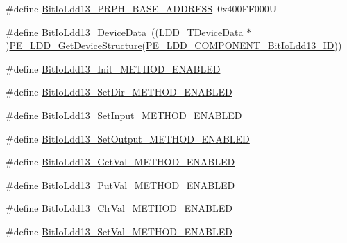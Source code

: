 \begin{DoxyCompactItemize}
\item 
\#define \hyperlink{group___bit_io_ldd13__module_ga9af6c37dac38dc95b22ff97e206a9021}{Bit\+Io\+Ldd13\+\_\+\+P\+R\+P\+H\+\_\+\+B\+A\+S\+E\+\_\+\+A\+D\+D\+R\+E\+SS}~0x400\+F\+F000U
\item 
\#define \hyperlink{group___bit_io_ldd13__module_gaced3b535c8325a9d8bcaa5fcc7de35d7}{Bit\+Io\+Ldd13\+\_\+\+Device\+Data}~((\hyperlink{group___p_e___types__module_gac5cf1362f1f0e3a2ce71b1bf2276d091}{L\+D\+D\+\_\+\+T\+Device\+Data} $\ast$)\hyperlink{group___p_e___types__module_gaa1c23d559daef5bcd3327ca83fb56f5a}{P\+E\+\_\+\+L\+D\+D\+\_\+\+Get\+Device\+Structure}(\hyperlink{group___p_e___types__module_ga4ef96663661667261ec29899d6e8c193}{P\+E\+\_\+\+L\+D\+D\+\_\+\+C\+O\+M\+P\+O\+N\+E\+N\+T\+\_\+\+Bit\+Io\+Ldd13\+\_\+\+ID}))
\item 
\#define \hyperlink{group___bit_io_ldd13__module_ga7f939fd29ea9a4135356c1ad35e5b70b}{Bit\+Io\+Ldd13\+\_\+\+Init\+\_\+\+M\+E\+T\+H\+O\+D\+\_\+\+E\+N\+A\+B\+L\+ED}
\item 
\#define \hyperlink{group___bit_io_ldd13__module_gafded67a88a7efefcbd5c98e1e91b11c4}{Bit\+Io\+Ldd13\+\_\+\+Set\+Dir\+\_\+\+M\+E\+T\+H\+O\+D\+\_\+\+E\+N\+A\+B\+L\+ED}
\item 
\#define \hyperlink{group___bit_io_ldd13__module_ga381b0f9ebd3d42e767e2f055436875be}{Bit\+Io\+Ldd13\+\_\+\+Set\+Input\+\_\+\+M\+E\+T\+H\+O\+D\+\_\+\+E\+N\+A\+B\+L\+ED}
\item 
\#define \hyperlink{group___bit_io_ldd13__module_ga8343bb6f91fd2e39cafd3bc1deb16a82}{Bit\+Io\+Ldd13\+\_\+\+Set\+Output\+\_\+\+M\+E\+T\+H\+O\+D\+\_\+\+E\+N\+A\+B\+L\+ED}
\item 
\#define \hyperlink{group___bit_io_ldd13__module_ga447c2d2dc0aaf2e6167f5ed603d68355}{Bit\+Io\+Ldd13\+\_\+\+Get\+Val\+\_\+\+M\+E\+T\+H\+O\+D\+\_\+\+E\+N\+A\+B\+L\+ED}
\item 
\#define \hyperlink{group___bit_io_ldd13__module_ga8bd3f8fef096bf595018116a0d0808b9}{Bit\+Io\+Ldd13\+\_\+\+Put\+Val\+\_\+\+M\+E\+T\+H\+O\+D\+\_\+\+E\+N\+A\+B\+L\+ED}
\item 
\#define \hyperlink{group___bit_io_ldd13__module_ga96d86b466508b8e3ba4342e527e44161}{Bit\+Io\+Ldd13\+\_\+\+Clr\+Val\+\_\+\+M\+E\+T\+H\+O\+D\+\_\+\+E\+N\+A\+B\+L\+ED}
\item 
\#define \hyperlink{group___bit_io_ldd13__module_gabc17c2e09694f871f364b31bf1288703}{Bit\+Io\+Ldd13\+\_\+\+Set\+Val\+\_\+\+M\+E\+T\+H\+O\+D\+\_\+\+E\+N\+A\+B\+L\+ED}
\item 

\end{DoxyCompactItemize}
